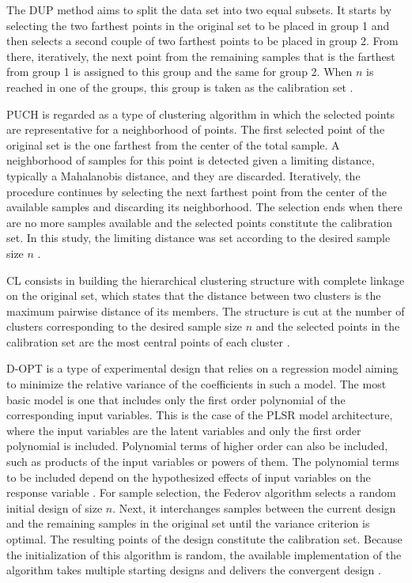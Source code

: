 \documentclass[journal=ancham,manuscript=article]{achemso}
\begin{document}
The DUP method aims to split the data set into two equal subsets. It starts by selecting the two farthest points in the original set to be placed in group 1 and then selects a second couple of two farthest points to be placed in group 2. From there, iteratively, the next point from the remaining samples that is the farthest from group 1 is assigned to this group and the same for group 2. When $n$ is reached in one of the groups, this group is taken as the calibration set \cite{Snee1977}.

PUCH is regarded as a type of clustering algorithm in which the selected points are representative for a neighborhood of points. The first selected point of the original set is the one farthest from the center of the total sample. A neighborhood of samples for this point is detected given a limiting distance, typically a Mahalanobis distance, and they are discarded. Iteratively, the procedure continues by selecting the next farthest point from the center of the available samples and discarding its neighborhood. The selection ends when there are no more samples available and the selected points constitute the calibration set. In this study, the limiting distance was set according to the desired sample size $n$ \cite{Puchwein1988}.

CL consists in building the hierarchical clustering structure with complete linkage on the original set, which states that the distance between two clusters is the maximum pairwise distance of its members. The structure is cut at the number of clusters corresponding to the desired sample size $n$ and the selected points in the calibration set are the most central points of each cluster \cite{Naes1990}.

D-OPT is a type of experimental design that relies on a regression model aiming to minimize the relative variance of the coefficients in such a model\cite{Goos2011}. The most basic model is one that includes only the first order polynomial of the corresponding input variables. This is the case of the PLSR model architecture, where the input variables are the latent variables and only the first order polynomial is included. Polynomial terms of higher order can also be included, such as products of the input variables or powers of them. The polynomial terms to be included depend on the hypothesized effects of input variables on the response variable \cite{Goos2011}. For sample selection, the Federov algorithm selects a random initial design of size $n$. Next, it interchanges samples between the current design and the remaining samples in the original set until the variance criterion is optimal. The resulting points of the design constitute the calibration set. Because the initialization of this algorithm is random, the available implementation of the algorithm takes multiple starting designs and delivers the convergent design \cite{Wheeler2019}.
\end{document}
